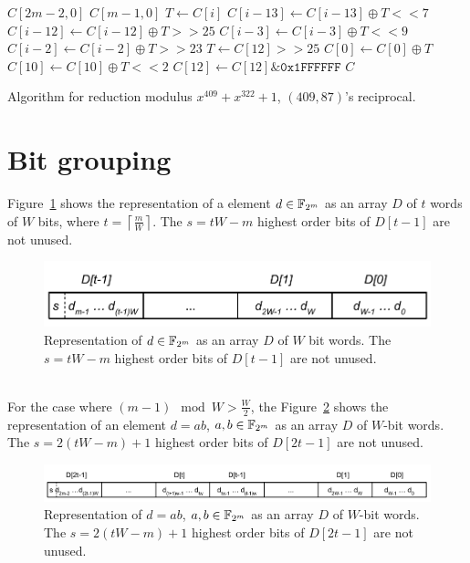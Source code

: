 \begin{algorithm}
\begin{algorithmic}[1]
  \REQUIRE $C[2m-2,0]$
  \ENSURE $C[m-1,0]$
    \STATE $T \gets C[i]$
    \STATE $C[i-13] \gets C[i-13] \oplus T << 7$
    \STATE $C[i-12] \gets C[i-12] \oplus T >> 25$
    \STATE $C[i-3] \gets C[i-3] \oplus T << 9$
    \STATE $C[i-2] \gets C[i-2] \oplus T >> 23$
  \ENDFOR
  \STATE $T \gets C[12] >> 25$
  \STATE $C[0] \gets C[0] \oplus T$
  \STATE $C[10] \gets C[10] \oplus T << 2$
  \STATE $C[12] \gets C[12] \& \texttt{0x1FFFFFF}$
  \RETURN $C$
  \caption{Algorithm for reduction modulus $x^{409} + x^{322} + 1$, $(409, 87)$'s reciprocal.}
  \label{alg:409_322}
\end{algorithmic}
\end{algorithm}

\section{Bit grouping}\label{bit-grouping}

Figure~\ref{fig:elemento:field} shows the representation of a element $d \in {\mathbb F}_{2^m}$ as an array $D$ of $t$ words of $W$ bits, where $t = \left \lceil \frac{m}{W} \right \rceil$. The $s = tW-m$ highest order bits of $D[t-1]$ are not unused.
\begin{figure}[htb]
  \centering
  \includegraphics[width = .55\columnwidth]{figures/element-word.pdf}
\caption{Representation of $d \in {\mathbb F}_{2^m}$ as an array $D$ of $W$ bit words. The $s = tW-m$ highest order bits of $D[t-1]$ are not unused.}
\label{fig:elemento:field}
\end{figure}
\\

For the case where $(m-1) \mod{W} > \frac{W}{2}$, the Figure~\ref{fig:elemento:field:mult} shows the representation of an element $d = ab$, $a,b \in {\mathbb F}_{2^m}$ as an array $D$ of $W$-bit words. The $s = 2(tW-m)+1$ highest order bits of $D[2t-1]$ are not unused.

\begin{figure}
  \centering
  \includegraphics[width = .9\columnwidth]{figures/two-word-element-1.pdf}
\caption{Representation of $d = ab$, $a,b \in {\mathbb F}_{2^m}$ as an array $D$ of $W$-bit words. The $s = 2(tW-m)+1$ highest order bits of $D[2t-1]$ are not unused.}
\label{fig:elemento:field:mult}
\end{figure}


